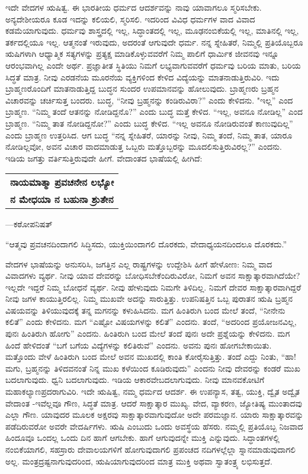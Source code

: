 ಇದೇ ವೇದಗಳ ಋಷಿತ್ವ. ಈ ಭಾರತೀಯ ಧರ್ಮದ ಆದರ್ಶವನ್ನು ನಾವು ಯಾವಾ\-ಗಲೂ ಸ್ಮರಿಸಬೇಕು. ಅನ್ಯದೇಶೀಯರೂ ಕೂಡ ಇದನ್ನು ಕಲಿಯಲಿ, ಸ್ಮರಿಸಲಿ. ಇದರಿಂದ ವಿವಿಧ ಧರ್ಮಗಳ ವಾದ ವಿವಾದ ಕಡಮೆಯಾಗುವುದು. ಧರ್ಮವು ಶಾಸ್ತ್ರದಲ್ಲಿ ಇಲ್ಲ, ಸಿದ್ಧಾಂತದಲ್ಲಿ ಇಲ್ಲ, ಮೂಢನಂಬಿಕೆಯಲ್ಲಿ ಇಲ್ಲ, ಮಾತಿನಲ್ಲಿ ಇಲ್ಲ, ತರ್ಕದಲ್ಲಿಯೂ ಇಲ್ಲ. ಆತ್ಮನಂತೆ ಇರುವುದು, ಅದರಂತೆ ಆಗುವುದೇ ಧರ್ಮ. ನನ್ನ ಸ್ನೇಹಿತರೆ, ನಿಮ್ಮಲ್ಲಿ ಪ್ರತಿಯೊಬ್ಬರೂ ಋಷಿಗಳಾಗಿ ಆಧ್ಯಾತ್ಮಿಕ ಸತ್ಯಗಳನ್ನು ಪ್ರತ್ಯಕ್ಷ ಮಾಡಿಕೊಳ್ಳುವವರೆಗೆ ನಿಮ್ಮ ಪಾಲಿಗೆ ಧಾರ್ಮಿಕ ಜೀವನವು ಇನ್ನೂ ಆರಂಭವಾಗಿಲ್ಲ ಎಂದೇ ಅರ್ಥ. ಪ್ರಜ್ಞಾತೀತ ಸ್ಥಿತಿಯು ನಿಮಗೆ ಲಭ್ಯವಾಗುವವರೆಗೆ ಧರ್ಮವು ಬರಿಯ ಮಾತು, ಬರಿಯ ಸಿದ್ಧತೆ ಮಾತ್ರ. ನೀವು ಎರಡನೆಯ ಮೂರನೆಯ ವ್ಯಕ್ತಿಗಳಿಂದ ಕೇಳಿದ ವಿದ್ಯೆಯನ್ನು ಮಾತನಾಡುತ್ತಿರುವಿರಿ. ಇದು ಬ್ರಾಹ್ಮಣರೊಂದಿಗೆ ಮಾತನಾಡುತ್ತಿದ್ದ ಬುದ್ಧನ ಸುಂದರ ಉಪಮಾನವನ್ನು ಹೋಲುವುದು. ಬ್ರಾಹ್ಮಣರು ಬ್ರಹ್ಮನ ವಿಚಾರವನ್ನು ಚರ್ಚಿಸುತ್ತ ಬಂದರು. ಬುದ್ಧ, “ನೀವು ಬ್ರಹ್ಮನನ್ನು ಕಂಡಿರುವಿರಾ?” ಎಂದು ಕೇಳಿದನು. "ಇಲ್ಲ” ಎಂದ ಬ್ರಾಹ್ಮಣ. “ನಿಮ್ಮ ತಂದೆ ಆತನನ್ನು ನೋಡಿದ್ದನೊ?” ಎಂದು ಬುದ್ಧ ಮತ್ತೆ ಕೇಳಿದ. “ಇಲ್ಲ, ಅವನೂ ನೋಡಿಲ್ಲ” ಎಂದ ಬ್ರಾಹ್ಮಣ. “ನಿಮ್ಮ ತಾತ ನೋಡಿದ್ದನೋ?” ಎಂದು ಬುದ್ಧ ಕೇಳಿದ. “ಇಲ್ಲ ಅವನೂ ನೋಡಿರುವಂತೆ ಕಾಣುವುದಿಲ್ಲ” ಎಂದು ಬ್ರಾಹ್ಮಣ ಉತ್ತರಿಸಿದ. ಆಗ ಬುದ್ಧ “ನನ್ನ ಸ್ನೇಹಿತರೆ, ಯಾರನ್ನು ನೀವು, ನಿಮ್ಮ ತಂದೆ, ನಿಮ್ಮ ತಾತ, ಯಾರೂ ನೋಡಿಲ್ಲವೋ, ಅವನ ವಿಚಾರ ವಾದಮಾಡುತ್ತ ಒಬ್ಬರು ಮತ್ತೊಬ್ಬರನ್ನು ಮೂದಲಿಸುತ್ತಿರುವಿರಲ್ಲ?” ಎಂದನು. ಇಡಿಯ ಜಗತ್ತು ವರ್ತಿಸುತ್ತಿರುವುದೇ ಹೀಗೆ. ವೇದಾಂತದ ಭಾಷೆಯಲ್ಲಿ ಹೀಗಿದೆ:

\begin{longtable}{@{}l@{}}
\textbf{ನಾಯಮಾತ್ಮಾ ಪ್ರವಚನೇನ ಲಭ್ಯೋ} \\
\textbf{ನ ಮೇಧಯಾ ನ ಬಹುನಾ ಶ್ರುತೇನ} \\
\end{longtable}

\hfill —ಕಠೋಪನಿಷತ್​

“ಆತ್ಮವು ಪ್ರವಚನದಿಂದಾಗಲಿ ಸಿದ್ಧಿಸದು, ಯುಕ್ತಿಯಿಂದಾಗಲಿ ದೊರಕದು, ವೇದಾಧ್ಯಯನದಿಂದಲೂ ದೊರಕದು.”

ವೇದಗಳ ಭಾಷೆಯನ್ನು ಅನುಸರಿಸಿ, ಜಗತ್ತಿನ ಎಲ್ಲ ರಾಷ್ಟ್ರಗಳನ್ನು ಉದ್ದೇಶಿಸಿ ಹೀಗೆ ಹೇಳೋಣ: ನಿಮ್ಮ ವಾದ ವಿವಾದಗಳು ವ್ಯರ್ಥ. ನೀವು ಯಾವ ದೇವರನ್ನು ಬೋಧಿಸಬೇಕೆಂದಿರುವಿರೋ, ನಿಮಗೆ ಅವನ ಸಾಕ್ಷಾತ್ಕಾರವಾಗಿದೆಯೇ? ಇಲ್ಲದೇ ಇದ್ದರೆ ನಿಮ್ಮ ಬೋಧನೆ ವ್ಯರ್ಥ. ನೀವು ಹೇಳುವುದು ನಿಮಗೇ ತಿಳಿದಿಲ್ಲ. ನಿಮಗೆ ದೇವರ ಸಾಕ್ಷಾತ್ಕಾರವಾಗಿದ್ದರೆ ನೀವು ಜಗಳ ಕಾಯುತ್ತಿರಲಿಲ್ಲ. ನಿಮ್ಮ ಮುಖವೇ ಅದನ್ನು ಸಾರುತ್ತಿತ್ತು. ಉಪನಿಷತ್ತಿನ ಒಬ್ಬ ಪುರಾತನ ಋಷಿ ಬ್ರಹ್ಮನ ವಿಷಯವನ್ನು ತಿಳಿಯುವುದಕ್ಕೆ ತನ್ನ ಮಗನನ್ನು ಕಳುಹಿಸಿದನು. ಮಗ ಹಿಂತಿರುಗಿ ಬಂದ ಮೇಲೆ ತಂದೆ, “ನೀನೇನು ಕಲಿತೆ” ಎಂದು ಕೇಳಿದನು. ಮಗ “ಎಷ್ಟೋ ವಿಷಯಗಳನ್ನು ಕಲಿತೆ” ಎಂದನು. ತಂದೆ, “ಅದರಿಂದ ಪ್ರಯೋಜನವಿಲ್ಲ, ಪುನಃ ಹಿಂತಿರುಗಿ ಹೋಗು” ಎಂದನು. ಹಿಂತಿರುಗಿ ಬಂದ ಮೇಲೆ ತಂದೆ ಪುನಃ ಅದೇ ಪ್ರಶ್ನೆಯನ್ನು ಕೇಳಿದನು. ಮಗ ಹಿಂದೆ ಹೇಳಿದಂತೆ “ಬಗೆ ಬಗೆಯ ವಿದ್ಯೆಗಳನ್ನು ಕಲಿತಿರುವೆ” ಎಂದನು. ಅವನು ಪುನಃ ಹೋಗಬೇಕಾಯಿತು. ಮತ್ತೊಂದು ವೇಳೆ ಹಿಂತಿರುಗಿ ಬಂದ ಮೇಲೆ ಅವನ ಮುಖದಲ್ಲಿ ಕಾಂತಿ ಕೋರೈಸುತ್ತಿತ್ತು. ತಂದೆ ಎದ್ದು ನಿಂತು, “ಹಾ! ಮಗು, ಬ್ರಹ್ಮನನ್ನು ತಿಳಿದವನಂತೆ ನಿನ್ನ ಮುಖ ಕಳೆಯಿಂದ ಕೂಡಿರುವುದು” ಎಂದನು ನೀವು ದೇವರನ್ನು ಕಂಡರೆ ಮುಖ ಬದಲಾಗುವುದು. ಧ್ವನಿ ಬದಲಾಗುವುದು. ಇಡಿಯ ಆಕಾರವೇ\break ಬದಲಾಗುವುದು. ನೀವು ಮಾನವಕೋಟಿಗೆ ಮಹಾಕಲ್ಯಾಣಪ್ರದರಾಗುವಿರಿ. ಇದೇ ಋಷಿತ್ವ, ನಮ್ಮ ಧರ್ಮದ ಆದರ್ಶ. ಈ ಉಪನ್ಯಾಸ, ತತ್ವ, ಯುಕ್ತಿ, ದ್ವೈತ ಅದ್ವೈತ ವೇದಾಂತ -ಇವೆಲ್ಲವೂ ಗೌಣ, ಸಿದ್ಧತೆ ಮಾತ್ರ. ಆದರೆ ಸಾಕ್ಷಾತ್ಕಾರ ಮುಖ್ಯ. ವೇದ, ವ್ಯಾಕರಣ, ಜ್ಯೋತಿಷ್ಯ ಮುಂತಾದವು ಎಲ್ಲಾ ಗೌಣ. ಯಾವುದರ ಮೂಲಕ ಅಕ್ಷರವು ಸಾಕ್ಷಾತ್ಕಾರವಾಗುವುದೋ ಅದೇ ಪರಮಜ್ಞಾನ. ಯಾರು ಸಾಕ್ಷಾತ್ಕಾರವನ್ನು ಪಡೆದಿರುವರೋ ಅವರೇ ವೇದರ್ಷಿಗಳು. ಋಷಿ ಎಂಬುದು ಒಂದು ಅವಸ್ಥೆಯ ಹೆಸರು. ನಮ್ಮಲ್ಲಿ ಪ್ರತಿಯೊಬ್ಬ ನಿಜವಾದ ಹಿಂದೂವೂ ಒಂದಲ್ಲ ಒಂದು ದಿನ ಹಾಗೆ ಆಗಬೇಕು. ಹಾಗೆ ಆಗುವುದನ್ನೇ ಮುಕ್ತಿ ಎನ್ನುವುದು. ಸಿದ್ಧಾಂತಗಳಲ್ಲಿ ನಂಬಿಕೆಯಾಗಲಿ, ಸಹಸ್ರಾರು ದೇವಾಲಯಗಳಿಗೆ ಹೋಗುವುದಾಗಲಿ ಪ್ರಪಂಚದ ನದಿಗಳಲ್ಲೆಲ್ಲಾ ಸ್ನಾನಮಾಡುವುದಾಗಲಿ ಅಲ್ಲ. ಮಂತ್ರದ್ರಷ್ಟನಾಗುವುದರಿಂದ, ಋಷಿಯಾಗುವುದರಿಂದ ಮಾತ್ರ ಮುಕ್ತಿ ಅಥವಾ ಸ್ವಾತಂತ್ರ್ಯ ಲಭಿಸುತ್ತದೆ.

